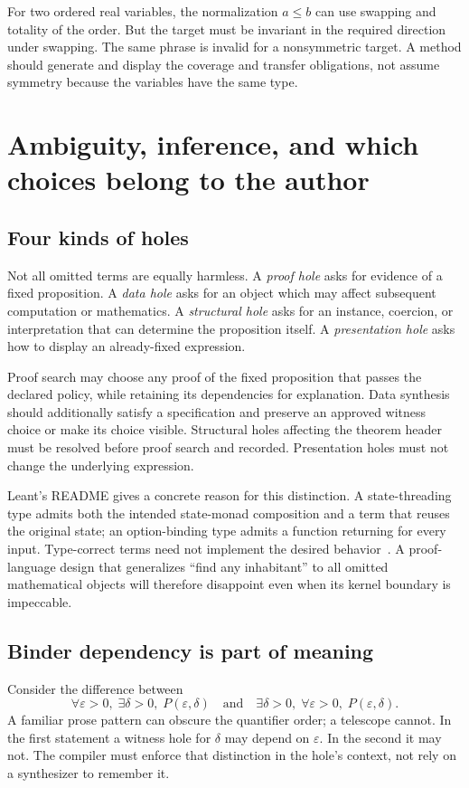 \documentclass[11pt,letterpaper]{article}
\theoremstyle{definition}
\theoremstyle{remark}
\newcommand{\code}[1]{\texttt{\detokenize{#1}}}
\begin{document}
For two ordered real variables, the normalization $a\le b$ can use swapping and totality of the order. But the target must be invariant in the required direction under swapping. The same phrase is invalid for a nonsymmetric target. A \code{wlog} method should generate and display the coverage and transfer obligations, not assume symmetry because the variables have the same type.

\section{Ambiguity, inference, and which choices belong to the author}
\label{sec:ambiguity}
\subsection{Four kinds of holes}
Not all omitted terms are equally harmless. A \emph{proof hole} asks for evidence of a fixed proposition. A \emph{data hole} asks for an object which may affect subsequent computation or mathematics. A \emph{structural hole} asks for an instance, coercion, or interpretation that can determine the proposition itself. A \emph{presentation hole} asks how to display an already-fixed expression.

Proof search may choose any proof of the fixed proposition that passes the declared policy, while retaining its dependencies for explanation. Data synthesis should additionally satisfy a specification and preserve an approved witness choice or make its choice visible. Structural holes affecting the theorem header must be resolved before proof search and recorded. Presentation holes must not change the underlying expression.

Leant's README gives a concrete reason for this distinction. A state-threading type admits both the intended state-monad composition and a term that reuses the original state; an option-binding type admits a function returning \code{none} for every input. Type-correct terms need not implement the desired behavior~\cite{leant-readme}. A proof-language design that generalizes ``find any inhabitant'' to all omitted mathematical objects will therefore disappoint even when its kernel boundary is impeccable.

\subsection{Binder dependency is part of meaning}
Consider the difference between
\[
 \forall\varepsilon>0,\;\exists\delta>0,\;P(\varepsilon,\delta)
 \quad\text{and}\quad
 \exists\delta>0,\;\forall\varepsilon>0,\;P(\varepsilon,\delta).
\]
A familiar prose pattern can obscure the quantifier order; a telescope cannot. In the first statement a witness hole for $\delta$ may depend on $\varepsilon$. In the second it may not. The compiler must enforce that distinction in the hole's context, not rely on a synthesizer to remember it.
\end{document}

